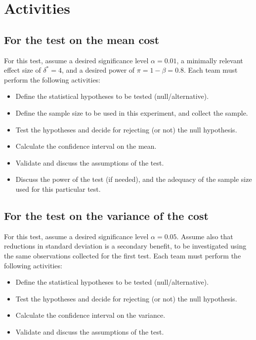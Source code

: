\documentclass[11pt,twoside,printwatermark=false]{pinp}
\providecommand{\tightlist}{%
  \setlength{\itemsep}{0pt}\setlength{\parskip}{0pt}}
\begin{document}
\newpage

\section{Activities}\label{activities}

\subsection{For the test on the mean
cost}\label{for-the-test-on-the-mean-cost}

For this test, assume a desired significance level \(\alpha = 0.01\), a
minimally relevant effect size of \(\delta^* = 4\), and a desired power
of \(\pi = 1 - \beta = 0.8\). Each team must perform the following
activities:

\begin{itemize}
\tightlist
\item
  Define the statistical hypotheses to be tested (null/alternative).
\item
  Define the sample size to be used in this experiment, and collect the
  sample.
\item
  Test the hypotheses and decide for rejecting (or not) the null
  hypothesis.
\item
  Calculate the confidence interval on the mean.
\item
  Validate and discuss the assumptions of the test.
\item
  Discuss the power of the test (if needed), and the adequacy of the
  sample size used for this particular test.
\end{itemize}

\subsection{For the test on the variance of the
cost}\label{for-the-test-on-the-variance-of-the-cost}

For this test, assume a desired significance level \(\alpha = 0.05\).
Assume also that reductions in standard deviation is a secondary
benefit, to be investigated using the same observations collected for
the first test. Each team must perform the following activities:

\begin{itemize}
\tightlist
\item
  Define the statistical hypotheses to be tested (null/alternative).
\item
  Test the hypotheses and decide for rejecting (or not) the null
  hypothesis.
\item
  Calculate the confidence interval on the variance.
\item
  Validate and discuss the assumptions of the test.
\end{itemize}
\end{document}
